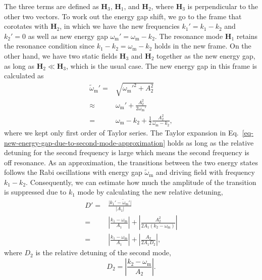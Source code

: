 \documentclass[%
reprint,
 amsmath,amssymb,
 prd,
]{revtex4-1}
\newcommand{\RD}{D}
\begin{document}
The three terms are defined as $\mathbf  H_3$, $\mathbf H_1$, and $\mathbf H_2$, where $\mathbf H_3$ is perpendicular to the other two vectors. To work out the energy gap shift, we go to the frame that corotates with $\mathbf H_2$, in which we have the new frequencies $k_1'=k_1-k_2$ and $k_2'=0$ as well as new energy gap $\omega_{\mathrm m}' = \omega_{\mathrm m}- k_2$. The resonance mode $\mathbf H_1$ retains the resonance condition since $k_1-k_2 = \omega_{\mathrm m}-k_2$ holds in the new frame. On the other hand, we have two static fields $\mathbf H_3$ and $\mathbf H_2$ together as the new energy gap, as long as $\mathbf H_2\ll \mathbf H_3$, which is the usual case. The new energy gap in this frame is calculated as
\begin{align}
    \tilde\omega_{\mathrm{m}}' =& \sqrt{\omega_{\mathrm{m}}'^2 + A_2^2 } \nonumber\\
    \approx & \omega_{\mathrm{m}}' + \frac{A_2^2}{2\omega_{\mathrm m}'} \nonumber\\
    =& \omega_{\mathrm m} - k_2 + \frac{1}{2}\frac{A_2^2}{\omega_{\mathrm m} - k_2},
    \label{eq-new-energy-gap-due-to-second-mode-approximation}
\end{align}
where we kept only first order of Taylor series. The Taylor expansion in Eq.~\ref{eq-new-energy-gap-due-to-second-mode-approximation} holds as long as the relative detuning for the second frequency is large which means the second frequency is off resonance. As an approximation, the transitions between the two energy states follows the Rabi oscillations with energy gap $\tilde \omega_{\mathrm m}$ and driving field with frequency $k_1-k_2$. Consequently, we can estimate how much the amplitude of the transition is suppressed due to $k_1$ mode by calculating the new relative detuning,
\begin{align}
    \RD' =& \frac{\lvert k_1' - \tilde \omega_{\mathrm m}' \rvert}{\lvert A_1 \rvert}\nonumber\\
    =& \left \lvert \frac{ k_1-\omega_{\mathrm m}}{ A_1} \right \rvert + \left\lvert \frac{ A_2^2 }{2  A_1 ( k_2 - \omega_{\mathrm m})} \right  \rvert\\
    =& \left \lvert  \frac{ k_1-\omega_{\mathrm m}}{ A_1} \right \rvert + \left \lvert \frac{ A_2 }{2 A_1 \RD_2 }\right \rvert ,
\end{align}
where $\RD_2$ is the relative detuning of the second mode,
\begin{equation*}
\RD_2 =  \left\lvert \frac{ k_2 - \omega_{\mathrm m}}{A_2} \right \rvert.
\end{equation*}
\end{document}
